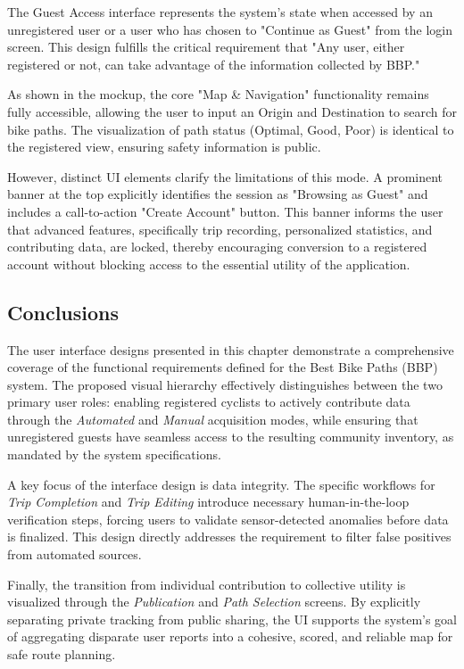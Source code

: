 \par The Guest Access interface represents the system's state when accessed by an unregistered user or a user who has chosen to "Continue as Guest" from the login screen. This design fulfills the critical requirement that "Any user, either registered or not, can take advantage of the information collected by BBP."

\par As shown in the mockup, the core "Map \& Navigation" functionality remains fully accessible, allowing the user to input an Origin and Destination to search for bike paths. The visualization of path status (Optimal, Good, Poor) is identical to the registered view, ensuring safety information is public.

\par However, distinct UI elements clarify the limitations of this mode. A prominent banner at the top explicitly identifies the session as "Browsing as Guest" and includes a call-to-action "Create Account" button. This banner informs the user that advanced features, specifically trip recording, personalized statistics, and contributing data, are locked, thereby encouraging conversion to a registered account without blocking access to the essential utility of the application.

\subsection{Conclusions}
\label{sect:ui_conclusions}

\par The user interface designs presented in this chapter demonstrate a comprehensive coverage of the functional requirements defined for the Best Bike Paths (BBP) system. The proposed visual hierarchy effectively distinguishes between the two primary user roles: enabling registered cyclists to actively contribute data through the \textit{Automated} and \textit{Manual} acquisition modes, while ensuring that unregistered guests have seamless access to the resulting community inventory, as mandated by the system specifications.

\par A key focus of the interface design is data integrity. The specific workflows for \textit{Trip Completion} and \textit{Trip Editing} introduce necessary human-in-the-loop verification steps, forcing users to validate sensor-detected anomalies before data is finalized. This design directly addresses the requirement to filter false positives from automated sources.

\par Finally, the transition from individual contribution to collective utility is visualized through the \textit{Publication} and \textit{Path Selection} screens. By explicitly separating private tracking from public sharing, the UI supports the system's goal of aggregating disparate user reports into a cohesive, scored, and reliable map for safe route planning.